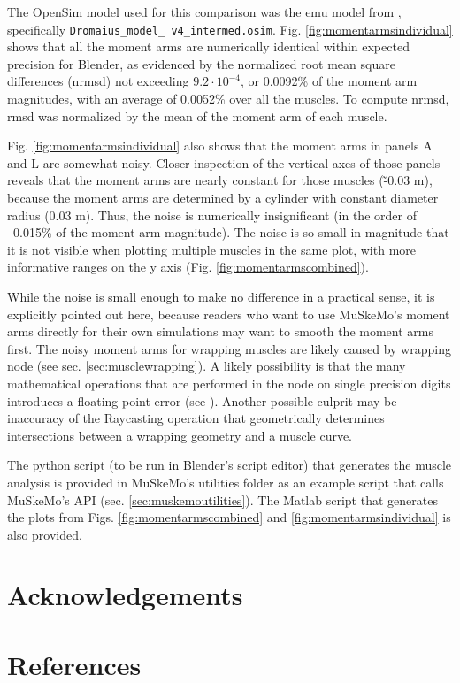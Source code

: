 \documentclass{article}
\begin{document}
The OpenSim model used for this comparison was the emu model from \cite{vanbijlertMusclecontrolledPhysicsSimulations2024a}, specifically \texttt{Dromaius\_model\_ \allowbreak v4\_intermed.\allowbreak osim}. Fig. \ref{fig:momentarmsindividual} shows that all the moment arms are numerically identical within expected precision for Blender, as evidenced by the normalized root mean square differences (nrmsd) not exceeding \(9.2 \cdot 10^{-4}\), or 0.0092\% of the moment arm magnitudes, with an average of 0.0052\% over all the muscles. To compute nrmsd, rmsd was normalized by the mean of the moment arm of each muscle.

Fig. \ref{fig:momentarmsindividual} also shows that the moment arms in panels A and L are somewhat noisy. Closer inspection of the vertical axes of those panels reveals that the moment arms are nearly constant for those muscles (\~ -0.03 \si{m}), because the moment arms are determined by a cylinder with constant diameter radius (0.03 \si{m}). Thus, the noise is numerically insignificant (in the order of ~0.015\% of the moment arm magnitude). The noise is so small in magnitude that it is not visible when plotting multiple muscles in the same plot, with more informative ranges on the y axis (Fig. \ref{fig:momentarmscombined}).

While the noise is small enough to make no difference in a practical sense, it is explicitly pointed out here, because readers who want to use MuSkeMo's moment arms directly for their own simulations may want to smooth the moment arms first. The noisy moment arms for wrapping muscles are likely caused by wrapping node (see sec. \ref{sec:musclewrapping}). A likely possibility is that the many mathematical operations that are performed in the node on single precision digits introduces a floating point error (see ). Another possible culprit may be inaccuracy of the Raycasting operation that geometrically determines intersections between a wrapping geometry and a muscle curve.

The python script (to be run in Blender's script editor) that generates the muscle analysis is provided in MuSkeMo's utilities folder as an example script that calls MuSkeMo's API (sec. \ref{sec:muskemoutilities}). The Matlab script that generates the plots from Figs. \ref{fig:momentarmscombined} and \ref{fig:momentarmsindividual} is also provided.

\newpage
\section{Acknowledgements}

\section*{References}
\printbibliography[heading=none] %
\end{document}
